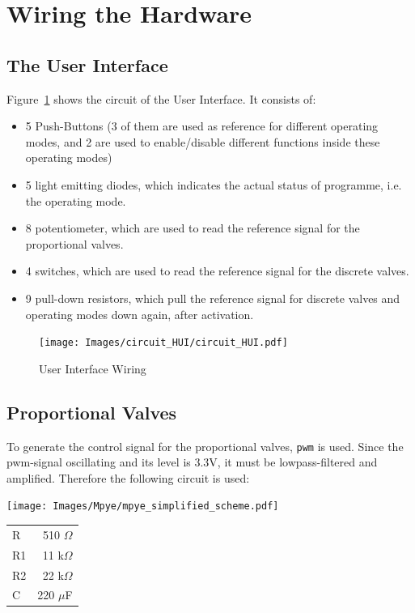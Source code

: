 \documentclass[
	fontsize=10pt
	paper=a4
]{scrartcl}
\begin{document}
\section{Wiring the Hardware}

\subsection{The User Interface}

Figure~\ref{fig:hui_circuit} shows the circuit of the User Interface. 
It consists of:
\begin{itemize}
	\item 5 Push-Buttons (3 of them are used as reference for different operating modes, and 2 are used to enable/disable different functions inside these operating modes)
	\item 5 light emitting diodes, which indicates the actual status of programme, i.e. the operating mode.
	\item 8 potentiometer, which are used to read the reference signal for the proportional valves.
	\item 4 switches, which are used to read the reference signal for the discrete valves.
	\item 9 pull-down resistors, which pull the reference signal for discrete valves and operating modes down again, after activation.
\end{itemize}

\begin{figure}[h!]
\begin{center}
\texttt{[image: Images/circuit\_HUI/circuit\_HUI.pdf]}
\caption{User Interface Wiring}
\label{fig:hui_circuit}
\end{center}
\end{figure}


\subsection{Proportional Valves}

To generate the control signal for the proportional valves, \texttt{pwm} is used.
Since the pwm-signal oscillating and its level is 3.3V, it must be lowpass-filtered and amplified.
Therefore the following circuit is used:

\texttt{[image: Images/Mpye/mpye\_simplified\_scheme.pdf]}
\begin{tabular}{lr}
R & 510 $\Omega$ \\
R1 & 11 k$\Omega$ \\
R2 & 22 k$\Omega$ \\
C & 220 $\mu$F
\end{tabular}
\end{document}
